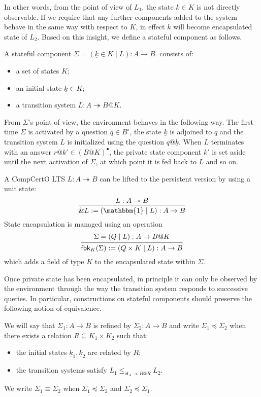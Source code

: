 \documentclass[acmsmall,screen,review,anonymous]{acmart}
\newcommand{\kw}[1]{\ensuremath{ \mathsf{#1} }}
\newcommand{\que}{\circ}
\newcommand{\ans}{\bullet}
\renewcommand{\preceq}{\preccurlyeq}
\newcommand{\intl}[1]{\underline{#1}}
\begin{document}
In other words,
from the point of view of $L_1$,
the state $k \in K$ is not directly observable.
If we require that any further components
added to the system
behave in the same way with respect to $K$,
in effect $k$ will become encapsulated state of $L_2$.
Based on this insight,
we define a stateful component as follows.

\begin{definition} \label{def:slts}
A stateful component
$\Sigma = (\intl{k} \in K \mid L) : A \rightarrow B$.
consists of:
\begin{itemize}
  \item a set of states $K$;
  \item an initial state $\intl{k} \in K$;
  \item a transition system $L : A \twoheadrightarrow B@K$.
\end{itemize}
\end{definition}

From $\Sigma$'s point of view,
the environment behaves in the following way.
The first time $\Sigma$ is activated by a question $q \in B^\que$,
the state $\intl{k}$ is adjoined to $q$
and the transition system $L$ is initialized using the question $q@\intl{k}$.
When $L$ terminates with an answer $r@k' \in (B@K)^\ans$,
the private state component $k'$
is set aside until
the next activation of $\Sigma$,
at which point it is fed back to $L$ and so on.

A CompCertO LTS $L : A \twoheadrightarrow B$
can be lifted to the persistent version
by using a unit state:
\[
  \begin{prooftree}
    \hypo{L : A \twoheadrightarrow B}
    \infer1{\&L := (\mathbbm{1} \mid L) : A \rightarrow B}
  \end{prooftree}
\]
State encapsulation is managed using an operation
\[
  \begin{prooftree}
    \hypo{\Sigma = (Q \mid L) : A \rightarrow B@K}
    \infer1{\mathsf{fbk}_K(\Sigma) := (Q \times K \mid L) : A \rightarrow B}
  \end{prooftree}
\]
which adds a field of type $K$ to the encapsulated state within $\Sigma$.

Once private state has been encapsulated,
in principle it can only be observed by the environment
through the way the transition system responds
to successive queries.
In particular,
constructions on stateful components
should preserve the following notion of equivalence.

\begin{definition} \label{def:ssim}
We will say that $\Sigma_1 : A \rightarrow B$
is refined by $\Sigma_2 : A \rightarrow B$
and write $\Sigma_1 \preceq \Sigma_2$
when there exists a relation $R \subseteq K_1 \times K_2$
such that:
\begin{itemize}
  \item the initial states $\intl{k}_1, \intl{k}_2$ are related by $R$;
  \item the transition systems satisfy
    $L_1 \le_{\kw{id}_A \twoheadrightarrow B@R} L_2$.
\end{itemize}
We write $\Sigma_1 \equiv \Sigma_2$ when
$\Sigma_1 \preceq \Sigma_2$ and
$\Sigma_2 \preceq \Sigma_1$.
\end{definition}
\end{document}
